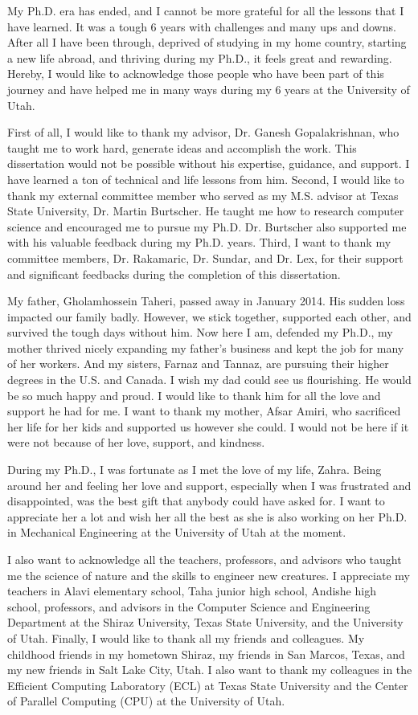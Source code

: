 My Ph.D. era has ended, and I cannot be more grateful for all the lessons that I have learned.
%
It was a tough 6 years with challenges and many ups and downs. After all I have been through, deprived of studying in my home country, starting a new life abroad, and thriving during my Ph.D., it feels great and rewarding.
%
Hereby, I would like to acknowledge those people who have been part of this journey and have helped me in
many ways during my 6 years at the University of Utah.

First of all, I would like to thank my advisor, Dr. Ganesh Gopalakrishnan, who taught me to work hard, generate ideas and accomplish the work.
%
This dissertation would not be possible without his expertise, guidance, and support.
%
I have learned a ton of technical and life lessons from him.
%
Second, I would like to thank my external committee member who served as my M.S. advisor at Texas State University, Dr. Martin Burtscher.
%
He taught me how to research computer science and encouraged me to pursue my Ph.D.
%
Dr. Burtscher also supported me with his valuable feedback during my Ph.D. years.
%
Third, I want to thank my committee members, Dr. Rakamaric, Dr. Sundar, and Dr. Lex, for their support and significant feedbacks during the completion of this dissertation.

My father, Gholamhossein Taheri, passed away in January 2014. His sudden loss impacted our family badly. However, we stick together, supported each other, and survived the tough days without him. Now here I am, defended my Ph.D., my mother thrived nicely expanding my father's business and kept the job for many of her workers. And my sisters, Farnaz and Tannaz, are pursuing their higher degrees in the U.S. and Canada. I wish my dad could see us flourishing. He would be so much happy and proud. I would like to thank him for all the love and support he had for me.
I want to thank my mother, Afsar Amiri, who sacrificed her life for her kids and supported us however she could. I would not be here if it were not because of her love, support, and kindness.

During my Ph.D., I was fortunate as I met the love of my life, Zahra. Being around her and feeling her love and support, especially when I was frustrated and disappointed, was the best gift that anybody could have asked for. I want to appreciate her a lot and wish her all the best as she is also working on her Ph.D. in Mechanical Engineering at the University of Utah at the moment.

I also want to acknowledge all the teachers, professors, and advisors who taught me the science of nature and the skills to engineer new creatures. I appreciate my teachers in Alavi elementary school, Taha junior high school, Andishe high school, professors, and advisors in the Computer Science and Engineering Department at the Shiraz University, Texas State University, and the University of Utah.
%
Finally, I would like to thank all my friends and colleagues. My childhood friends in my hometown Shiraz, my friends in San Marcos, Texas, and my new friends in Salt Lake City, Utah. I also want to thank my colleagues in the Efficient Computing Laboratory (ECL) at Texas State University and the Center of Parallel Computing (CPU) at the University of Utah.
